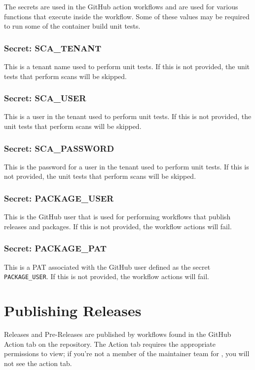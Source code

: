 The secrets are used in the GitHub action workflows and are used for various functions
that execute inside the workflow.  Some of these values may be required to run some
of the container build unit tests.

\subsubsection{Secret: SCA\_TENANT}
This is a \cxsca tenant name used to perform unit tests.  If this is not provided,
the unit tests that perform scans will be skipped.

\subsubsection{Secret: SCA\_USER}
This is a user in the \cxsca tenant used to perform unit tests.  If this is not provided,
the unit tests that perform scans will be skipped.

\subsubsection{Secret: SCA\_PASSWORD}
This is the password for a user in the \cxsca tenant used to perform unit tests.  
If this is not provided,
the unit tests that perform scans will be skipped.

\subsubsection{Secret: PACKAGE\_USER}
This is the GitHub user that is used for performing workflows that
publish releases and packages.  If this is not provided, the workflow actions
will fail.

\subsubsection{Secret: PACKAGE\_PAT}

This is a PAT associated with the GitHub user defined as the secret
\texttt{PACKAGE\_USER}. If this is not provided, the workflow actions
will fail.

\section{Publishing Releases}

Releases and Pre-Releases are published by workflows found in the GitHub Action
tab on the repository.  The Action tab requires the appropriate permissions
to view; if you're not a member of the maintainer team for \cxtoolkit, you will
not see the action tab.


